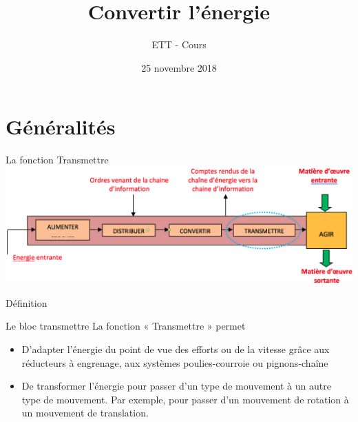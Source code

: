 \documentclass{beamer}
\title{Convertir l'énergie}
\subtitle{}
\author{ETT - Cours}
\institute{Lycée Louis Armand}
\date{25 novembre 2018}
\begin{document}
\begin{frame}{}

\end{frame}
    \begin{frame}
        \maketitle
    \end{frame}

    \begin{frame}
        \tableofcontents
    \end{frame}

    \section{Généralités}
    \begin{frame}{La fonction Transmettre}
      \centering
      \includegraphics[width=\textwidth]{images/S03_C04}
    \end{frame}


    \begin{frame}{Définition}
      \begin{alertblock}{Le bloc transmettre}
        La fonction « Transmettre » permet
        \begin{itemize}
          \item D'adapter l’énergie du point de vue des efforts ou de la vitesse grâce aux réducteurs à engrenage, aux systèmes poulies-courroie ou pignons-chaîne
          \item De transformer l’énergie pour passer d’un type de mouvement à un autre type de mouvement. Par exemple, pour passer d’un mouvement de rotation à un mouvement de translation.
        \end{itemize}

      \end{alertblock}
    \end{frame}
\end{document}
